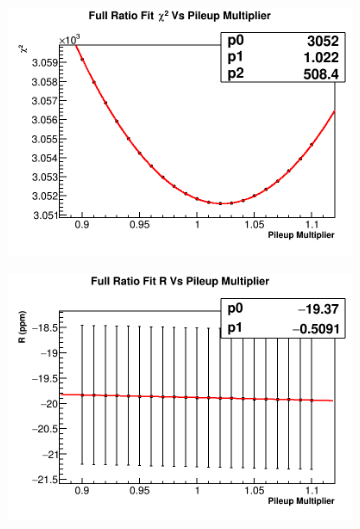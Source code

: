 \begin{figure}[H]
\centering
    \begin{subfigure}[]{0.45\textwidth}
	    \centering
		\includegraphics[width=\textwidth]{RatioCBO_Chi2_Vs_PileupMultiplier_Canv}
	    \caption{}
    \end{subfigure}
    \hspace{4mm}
    \begin{subfigure}[]{0.45\textwidth}
	    \centering
		\includegraphics[width=\textwidth]{RatioCBO_R_Vs_PileupMultiplier_Canv}
	    \caption{}
    \end{subfigure}
\caption[PileupMultiplier]{}
\label{fig:PileupMultiplier}
\end{figure}





